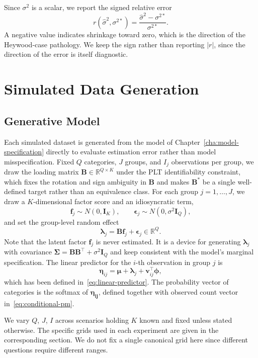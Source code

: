 Since $\sigma^2$ is a scalar, we report the signed relative error
\[
r(\hat\sigma^2, \sigma^{2\ast}) = \frac{\hat\sigma^2 - \sigma^{2\ast}}{\sigma^{2\ast}}.
\]
A negative value indicates shrinkage toward zero, which is the direction of the Heywood-case pathology. We keep the sign rather than reporting $|r|$, since the direction of the error is itself diagnostic.

\section{Simulated Data Generation}
\label{sec:sim-data}

\subsection{Generative Model}

Each simulated dataset is generated from the model of Chapter~\ref{cha:model-specification} directly to evaluate estimation error rather than model misspecification. Fixed $Q$ categories, $J$ groups, and $I_{j}$ observations per group, we draw the loading matrix $\mathbf{B} \in \mathbb{R}^{Q \times K}$ under the PLT identifiability constraint, which fixes the rotation and sign ambiguity in $\mathbf{B}$ and makes $\mathbf{B}^{*}$ be a single well-defined target rather than an equivalence class. For each group $j = 1, \dots, J$, we draw a $K$-dimensional factor score and an idiosyncratic term,
\[
\mathbf{f}_j \sim N(0, \mathbf{I}_K), \qquad \bm{\epsilon}_j \sim N(0, \sigma^2 \mathbf{I}_Q),
\]
and set the group-level random effect
\[
\bm{\lambda}_j = \mathbf{Bf}_j + \bm{\epsilon}_j \in \mathbb{R}^Q.
\]
Note that the latent factor $\mathbf{f}_j$ is never estimated. It is a device for generating $\bm{\lambda}_j$ with covariance $\bm{\Sigma} = \mathbf{BB}^\top + \sigma^2 \mathbf{I}_Q$ and keep consistent with the model's marginal specification. The linear predictor for the $i$-th observation in group $j$ is
\[
\bm{\eta}_{ij} = \bm{\mu} + \bm{\lambda}_j + \bm{v}_{ij}^\top \bm{\phi},
\]
which has been defined in~\ref{eq:linear-predictor}. The probability vector of categories is the softmax of $\bm{\eta_{ij}}$, defined together with observed count vector in~\ref{eq:conditional-pm}.

We vary $Q$, $J$, $I$ across scenarios holding $K$ known and fixed unless stated otherwise. The specific grids used in each experiment are given in the corresponding section. We do not fix a single canonical grid here since different questions require different ranges. 

